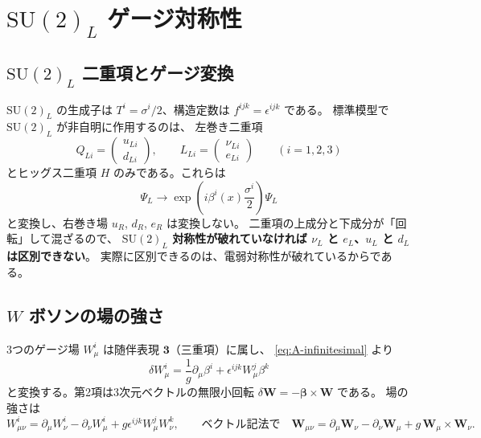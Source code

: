 \documentclass[uplatex,dvipdfmx,a4paper,11pt,openany]{jsbook}
\numberwithin{equation}{chapter}
\theoremstyle{definition}
\theoremstyle{plain}
\theoremstyle{remark}
\newcommand{\SU}{\mathrm{SU}}
\begin{document}
\section{$\SU(2)_L$ ゲージ対称性}
\subsection{$\SU(2)_L$ 二重項とゲージ変換}
$\SU(2)_L$ の生成子は $T^i=\sigma^i/2$、構造定数は $f^{ijk}=\epsilon^{ijk}$ である。
標準模型で $\SU(2)_L$ が非自明に作用するのは、
左巻き二重項
\begin{equation}
Q_{Li}=\begin{pmatrix}u_{Li}\\ d_{Li}\end{pmatrix},
\qquad
L_{Li}=\begin{pmatrix}\nu_{Li}\\ e_{Li}\end{pmatrix}
\qquad(i=1,2,3)
\end{equation}
とヒッグス二重項 $H$ のみである。これらは
\begin{equation}
\Psi_L\longrightarrow\exp\left(i\beta^i(x)\frac{\sigma^i}{2}\right)\Psi_L
\end{equation}
と変換し、右巻き場 $u_R$, $d_R$, $e_R$ は変換しない。
二重項の上成分と下成分が「回転」して混ざるので、
\textbf{$\SU(2)_L$ 対称性が破れていなければ $\nu_L$ と $e_L$、$u_L$ と $d_L$ は区別できない}。
実際に区別できるのは、電弱対称性が破れているからである。
\subsection{$W$ ボソンの場の強さ}
3つのゲージ場 $W_\mu^i$ は随伴表現 $\mathbf{3}$（三重項）に属し、
\eqref{eq:A-infinitesimal} より
\begin{equation}
\delta W_\mu^i=\frac1g\partial_\mu\beta^i+\epsilon^{ijk}W_\mu^j\beta^k
\end{equation}
と変換する。第2項は3次元ベクトルの無限小回転 $\delta\bm W=-\bm\beta\times\bm W$ である。
場の強さは
\begin{equation}
W_{\mu\nu}^i=\partial_\mu W_\nu^i-\partial_\nu W_\mu^i+g\epsilon^{ijk}W_\mu^jW_\nu^k,
\qquad
\text{ベクトル記法で}\quad
\bm W_{\mu\nu}=\partial_\mu\bm W_\nu-\partial_\nu\bm W_\mu+g\,\bm W_\mu\times\bm W_\nu .
\end{equation}
\end{document}
